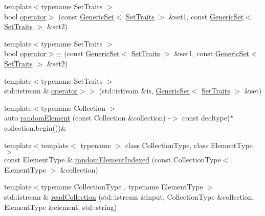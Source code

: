 \begin{DoxyCompactItemize}
\item 
{\footnotesize template$<$typename Set\+Traits $>$ }\\bool \mbox{\hyperlink{namespacestanfordcpplib_1_1collections_a9a356d27539088a865903569a4e198cb}{operator$>$}} (const \mbox{\hyperlink{classstanfordcpplib_1_1collections_1_1GenericSet}{Generic\+Set}}$<$ \mbox{\hyperlink{structstanfordcpplib_1_1collections_1_1SetTraits}{Set\+Traits}} $>$ \&set1, const \mbox{\hyperlink{classstanfordcpplib_1_1collections_1_1GenericSet}{Generic\+Set}}$<$ \mbox{\hyperlink{structstanfordcpplib_1_1collections_1_1SetTraits}{Set\+Traits}} $>$ \&set2)
\item 
{\footnotesize template$<$typename Set\+Traits $>$ }\\bool \mbox{\hyperlink{namespacestanfordcpplib_1_1collections_a74205d7cc4c0eb3e1c7dfc3d9cf333af}{operator$>$=}} (const \mbox{\hyperlink{classstanfordcpplib_1_1collections_1_1GenericSet}{Generic\+Set}}$<$ \mbox{\hyperlink{structstanfordcpplib_1_1collections_1_1SetTraits}{Set\+Traits}} $>$ \&set1, const \mbox{\hyperlink{classstanfordcpplib_1_1collections_1_1GenericSet}{Generic\+Set}}$<$ \mbox{\hyperlink{structstanfordcpplib_1_1collections_1_1SetTraits}{Set\+Traits}} $>$ \&set2)
\item 
{\footnotesize template$<$typename Set\+Traits $>$ }\\std\+::istream \& \mbox{\hyperlink{namespacestanfordcpplib_1_1collections_afd211a8f34fadfd9aa8c4749432437b8}{operator$>$$>$}} (std\+::istream \&is, \mbox{\hyperlink{classstanfordcpplib_1_1collections_1_1GenericSet}{Generic\+Set}}$<$ \mbox{\hyperlink{structstanfordcpplib_1_1collections_1_1SetTraits}{Set\+Traits}} $>$ \&set)
\item 
{\footnotesize template$<$typename Collection $>$ }\\auto \mbox{\hyperlink{namespacestanfordcpplib_1_1collections_a189ddb6ed4fe9f98bce310facfc6612d}{random\+Element}} (const Collection \&collection) -\/$>$ const decltype($\ast$collection.\+begin())\&
\item 
{\footnotesize template$<$template$<$ typename $>$ class Collection\+Type, class Element\+Type $>$ }\\const Element\+Type \& \mbox{\hyperlink{namespacestanfordcpplib_1_1collections_acec813d0f7952ab557a897ffb0e4b430}{random\+Element\+Indexed}} (const Collection\+Type$<$ Element\+Type $>$ \&collection)
\item 
{\footnotesize template$<$typename Collection\+Type , typename Element\+Type $>$ }\\std\+::istream \& \mbox{\hyperlink{namespacestanfordcpplib_1_1collections_a367f8a5aa711274547c7b1628c3a42c6}{read\+Collection}} (std\+::istream \&input, Collection\+Type \&collection, Element\+Type \&element, std\+::string)

\end{DoxyCompactItemize}
